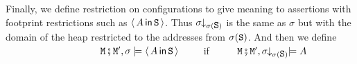  
Finally, we define restriction on configurations to 
give meaning to assertions with footprint restrictions such as \eg
$\Using {\A} {\prg{S}}$.
Thus $\sigma\!\!\downarrow_{\sigma(\prg{S})}$ is the same as $\sigma$ but with the domain of the heap restricted
 to the addresses from $\sigma(\prg{S})$. And then we define\\
   $~ \strut  \hspace{1.3in} \M \mkpair  {\M'},\sigma  \models\Using {\A} {\prg{S}}$\ \ \ \ \ if \ \ \ \  \  $\M \mkpair  {\M'},\sigma\!\!\downarrow_{\sigma(\prg{S})}  \models {\A}$
